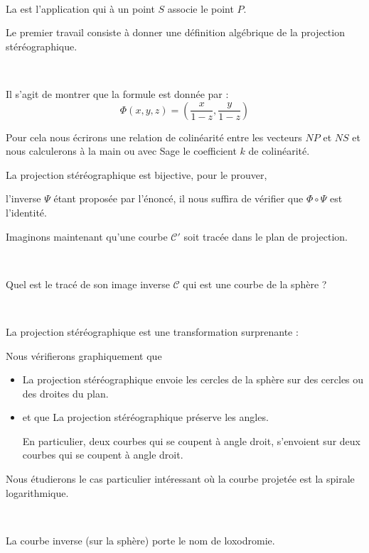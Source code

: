 ~

La 
est l'application qui à un point $S$ associe le point $P$.


\diapo

Le premier travail consiste à donner une définition algébrique de la projection stéréographique.

~

Il s'agit de montrer que la formule est donnée par : 
  $$  \Phi(x,y,z) = \left( \frac{x}{1-z}, \frac{y}{1-z} \right)$$


Pour cela nous écrirons une relation de colinéarité entre les vecteurs
$NP$ et $NS$ et nous calculerons à la main ou avec Sage le coefficient $k$ de colinéarité.

La projection stéréographique est bijective, pour le prouver,


l'inverse $\Psi$ étant proposée par l'énoncé, il nous suffira de vérifier que $\Phi \circ \Psi$ est l'identité.

\diapo


Imaginons maintenant qu'une courbe $\mathcal{C}'$ soit tracée dans le plan de projection.

~

Quel est le tracé de son image inverse $\mathcal{C}$ qui est une courbe de la sphère ?

 
~

La projection stéréographique est une transformation surprenante :

Nous vérifierons graphiquement que
\begin{itemize}
\item  \og La projection stéréographique envoie les cercles de la sphère sur des cercles ou des droites du plan.\fg
 
 
\item et que \og La projection stéréographique préserve les angles.\fg\ 


En particulier, deux courbes qui se coupent  à angle droit, s'envoient sur deux courbes qui se coupent à angle droit.
 
\end{itemize} 


Nous étudierons le cas particulier intéressant où la courbe projetée est la spirale logarithmique.

~

La courbe inverse (sur la sphère) porte le nom de loxodromie.


